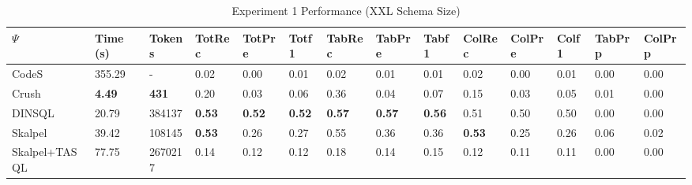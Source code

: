 \begin{table*}
\caption{Experiment 1 Performance (XXL Schema Size)}
\label{tab:exp1-xxl-schema}
\begin{tabular}{llllllllllllll}
\toprule
$\Psi$ & Time (s) & Tokens & TotRec & TotPre & Totf1 & TabRec & TabPre & Tabf1 & ColRec & ColPre & Colf1 & TabPrp & ColPrp \\
\midrule
CodeS & 355.29 & - & 0.02 & 0.00 & 0.01 & 0.02 & 0.01 & 0.01 & 0.02 & 0.00 & 0.01 & 0.00 & 0.00 \\
Crush & \textbf{4.49} & \textbf{431} & 0.20 & 0.03 & 0.06 & 0.36 & 0.04 & 0.07 & 0.15 & 0.03 & 0.05 & 0.01 & 0.00 \\
DINSQL & 20.79 & 384137 & \textbf{0.53} & \textbf{0.52} & \textbf{0.52} & \textbf{0.57} & \textbf{0.57} & \textbf{0.56} & 0.51 & 0.50 & 0.50 & 0.00 & 0.00 \\
Skalpel & 39.42 & 108145 & \textbf{0.53} & 0.26 & 0.27 & 0.55 & 0.36 & 0.36 & \textbf{0.53} & 0.25 & 0.26 & 0.06 & 0.02 \\
Skalpel+TASQL & 77.75 & 2670217 & 0.14 & 0.12 & 0.12 & 0.18 & 0.14 & 0.15 & 0.12 & 0.11 & 0.11 & 0.00 & 0.00 \\
\bottomrule
\end{tabular}
\end{table*}
